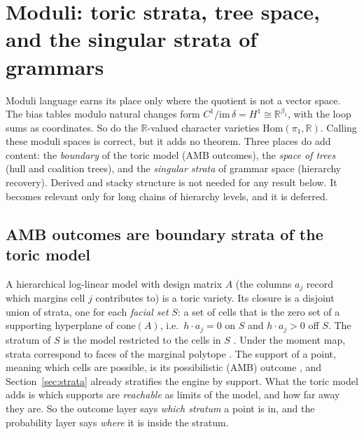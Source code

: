 \documentclass[11pt]{article}
\theoremstyle{definition}
\theoremstyle{remark}
\newcommand{\R}{\mathbb{R}}
\begin{document}
\section{Moduli: toric strata, tree space, and the singular strata of grammars}\label{sec:moduli}
Moduli language earns its place only where the quotient is not a vector space. The bias tables modulo natural changes form $C^1/\mathrm{im}\,\delta=H^1\cong\R^{\beta_1}$, with the loop sums as coordinates. So do the $\R$-valued character varieties $\mathrm{Hom}(\pi_1,\R)$. Calling these moduli spaces is correct, but it adds no theorem. Three places do add content: the \emph{boundary} of the toric model (AMB outcomes), the \emph{space of trees} (hull and coalition trees), and the \emph{singular strata} of grammar space (hierarchy recovery). Derived and stacky structure is not needed for any result below. It becomes relevant only for long chains of hierarchy levels, and it is deferred.

\subsection{AMB outcomes are boundary strata of the toric model}\label{sec:toricstrata}
A hierarchical log-linear model with design matrix $A$ (the columns $a_j$ record which margins cell $j$ contributes to) is a toric variety. Its closure is a disjoint union of strata, one for each \emph{facial set} $S$: a set of cells that is the zero set of a supporting hyperplane of $\mathrm{cone}(A)$, i.e.\ $h\cdot a_j=0$ on $S$ and $h\cdot a_j>0$ off $S$. The stratum of $S$ is the model restricted to the cells in $S$ \cite{gms06,fr12,efrs06,sullivant}. Under the moment map, strata correspond to faces of the marginal polytope \cite{fulton,cls}. The support of a point, meaning which cells are possible, is its possibilistic (AMB) outcome \cite{ab11}, and Section~\ref{sec:strata} already stratifies the engine by support. What the toric model adds is which supports are \emph{reachable} as limits of the model, and how far away they are. So the outcome layer says \emph{which stratum} a point is in, and the probability layer says \emph{where} it is inside the stratum.
\end{document}
